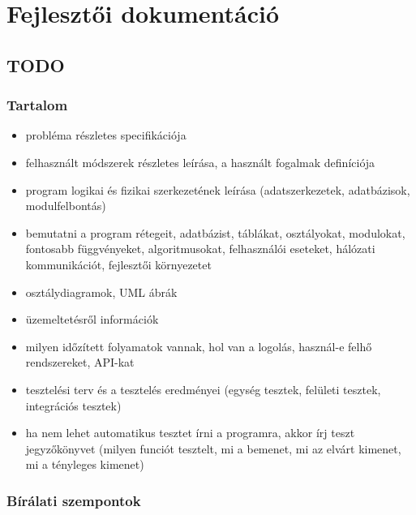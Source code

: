 \chapter{Fejlesztői dokumentáció} %
\label{ch:impl}

\section{TODO}
\subsection{Tartalom}
\begin{itemize}
    \item probléma részletes specifikációja
	\item felhasznált módszerek részletes leírása, a használt fogalmak definíciója
	\item program logikai és fizikai szerkezetének leírása (adatszerkezetek, adatbázisok, modulfelbontás)
	\item bemutatni a program rétegeit, adatbázist, táblákat, osztályokat, modulokat, fontosabb függvényeket, algoritmusokat, felhasználói eseteket, hálózati kommunikációt, fejlesztői környezetet
	\item osztálydiagramok, UML ábrák
	\item üzemeltetésről információk
	\item milyen időzített folyamatok vannak, hol van a logolás, használ-e felhő rendszereket, API-kat
	\item tesztelési terv és a tesztelés eredményei (egység tesztek, felületi tesztek, integrációs tesztek)
	\item ha nem lehet automatikus tesztet írni a programra, akkor írj teszt jegyzőkönyvet (milyen funciót tesztelt, mi a bemenet, mi az elvárt kimenet, mi a tényleges kimenet)
\end{itemize}

\subsection{Bírálati szempontok}
